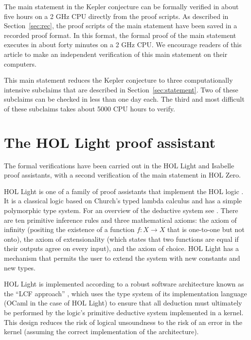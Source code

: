 
The main statement in the Kepler conjecture can be formally verified
in about five hours on a 2 GHz CPU directly from the proof scripts.
As described in Section~\ref{sec:rec}, the proof scripts of the main
statement have been saved in a recorded proof format.  In this format,
the formal proof of the main statement executes in about forty minutes on a
2 GHz CPU.  We encourage readers of this article to make an
independent verification of this main statement on their computers.



This main statement reduces the Kepler conjecture to three
computationally intensive subclaims that are described in
Section~\ref{sec:statement}.  Two of these subclaims can be checked in
less than one day each.  The third and most difficult of these
subclaims takes about 5000 CPU hours to verify.



\section{The HOL Light proof assistant}\label{sec:hl}

The formal verifications have been carried out in the HOL Light and
Isabelle proof assistants, with a second verification of the main statement
in HOL Zero.

HOL Light is one of a family of proof assistants that implement the
HOL logic \cite{gordon1993introduction}.  It is a classical logic
based on Church's typed lambda calculus and has a simple polymorphic
type system.  For an overview of the deductive system see
\cite{harrison2009hol}.  There are ten primitive inference rules and
three mathematical axioms: the axiom of infinity (positing the
existence of a function $f:X\to X$ that is one-to-one but not onto),
the axiom of extensionality (which states that two functions are equal
if their outputs agree on every input), and the axiom of choice.  HOL
Light has a mechanism that permits the user to extend the system with
new constants and new types.

HOL Light is implemented according to a robust software architecture
known as the ``LCF approach'' \cite{gordon1979edinburgh}, which uses
the type system of its implementation language (OCaml in the case of
HOL Light) to ensure that all deduction must ultimately be
performed by the logic's primitive deductive system implemented in a
kernel.  This design reduces the risk of logical unsoundness to the
risk of an error in the kernel (assuming the correct implementation of
the architecture).

